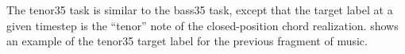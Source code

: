 
The \gls{tenor35} task is similar to the \gls{bass35} task,
except that the target label at a given timestep is the
``tenor'' note of the \gls{closed-position} chord
realization.  shows an example of the
\gls{tenor35} target label for the previous fragment of
music.


